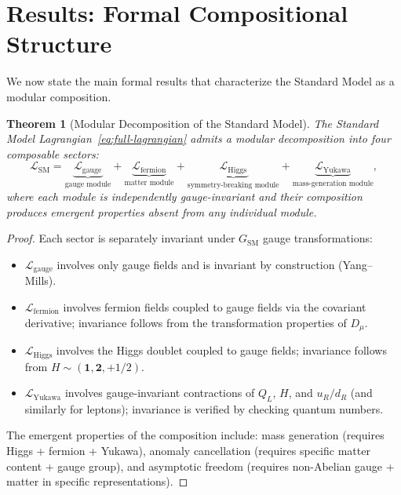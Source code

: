 \documentclass[12pt]{article}
\newtheorem{theorem}{Theorem}[section]
\theoremstyle{definition}
\theoremstyle{remark}
\newcommand{\lag}{\mathcal{L}}
\newcommand{\dmu}{D_\mu}
\begin{document}
\section{Results: Formal Compositional Structure}
\label{sec:results}

We now state the main formal results that characterize the Standard Model as a modular composition.

\begin{theorem}[Modular Decomposition of the Standard Model]
\label{thm:modular-decomposition}
The Standard Model Lagrangian~\eqref{eq:full-lagrangian} admits a modular decomposition into four composable sectors:
\begin{equation}
\lag_{\mathrm{SM}} = \underbrace{\lag_{\mathrm{gauge}}}_{\text{gauge module}} + \underbrace{\lag_{\mathrm{fermion}}}_{\text{matter module}} + \underbrace{\lag_{\mathrm{Higgs}}}_{\text{symmetry-breaking module}} + \underbrace{\lag_{\mathrm{Yukawa}}}_{\text{mass-generation module}},
\end{equation}
where each module is independently gauge-invariant and their composition produces emergent properties absent from any individual module.
\end{theorem}

\begin{proof}
Each sector is separately invariant under $G_{\mathrm{SM}}$ gauge transformations:
\begin{itemize}
\item $\lag_{\mathrm{gauge}}$ involves only gauge fields and is invariant by construction (Yang--Mills).
\item $\lag_{\mathrm{fermion}}$ involves fermion fields coupled to gauge fields via the covariant derivative; invariance follows from the transformation properties of $\dmu$.
\item $\lag_{\mathrm{Higgs}}$ involves the Higgs doublet coupled to gauge fields; invariance follows from $H \sim (\mathbf{1}, \mathbf{2}, +1/2)$.
\item $\lag_{\mathrm{Yukawa}}$ involves gauge-invariant contractions of $Q_L$, $H$, and $u_R/d_R$ (and similarly for leptons); invariance is verified by checking quantum numbers.
\end{itemize}
The emergent properties of the composition include: mass generation (requires Higgs + fermion + Yukawa), anomaly cancellation (requires specific matter content + gauge group), and asymptotic freedom (requires non-Abelian gauge + matter in specific representations).
\end{proof}
\end{document}
